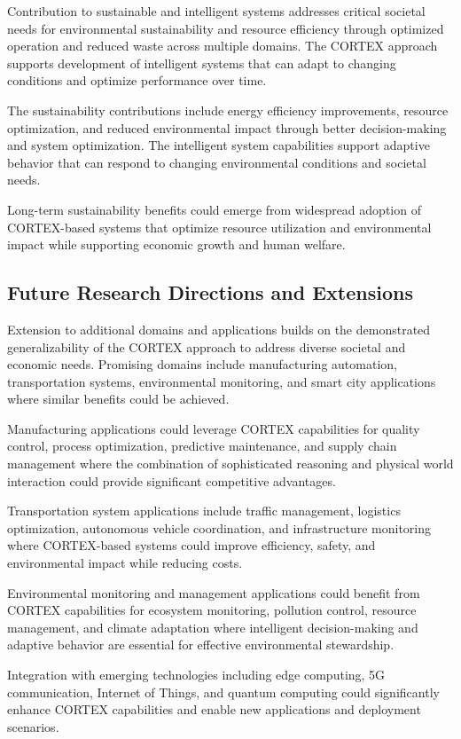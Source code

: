 Contribution to sustainable and intelligent systems addresses critical societal needs for environmental sustainability and resource efficiency through optimized operation and reduced waste across multiple domains. The CORTEX approach supports development of intelligent systems that can adapt to changing conditions and optimize performance over time.

The sustainability contributions include energy efficiency improvements, resource optimization, and reduced environmental impact through better decision-making and system optimization. The intelligent system capabilities support adaptive behavior that can respond to changing environmental conditions and societal needs.

Long-term sustainability benefits could emerge from widespread adoption of CORTEX-based systems that optimize resource utilization and environmental impact while supporting economic growth and human welfare.

\subsection{Future Research Directions and Extensions}

Extension to additional domains and applications builds on the demonstrated generalizability of the CORTEX approach to address diverse societal and economic needs. Promising domains include manufacturing automation, transportation systems, environmental monitoring, and smart city applications where similar benefits could be achieved.

Manufacturing applications could leverage CORTEX capabilities for quality control, process optimization, predictive maintenance, and supply chain management where the combination of sophisticated reasoning and physical world interaction could provide significant competitive advantages.

Transportation system applications include traffic management, logistics optimization, autonomous vehicle coordination, and infrastructure monitoring where CORTEX-based systems could improve efficiency, safety, and environmental impact while reducing costs.

Environmental monitoring and management applications could benefit from CORTEX capabilities for ecosystem monitoring, pollution control, resource management, and climate adaptation where intelligent decision-making and adaptive behavior are essential for effective environmental stewardship.

Integration with emerging technologies including edge computing, 5G communication, Internet of Things, and quantum computing could significantly enhance CORTEX capabilities and enable new applications and deployment scenarios.

